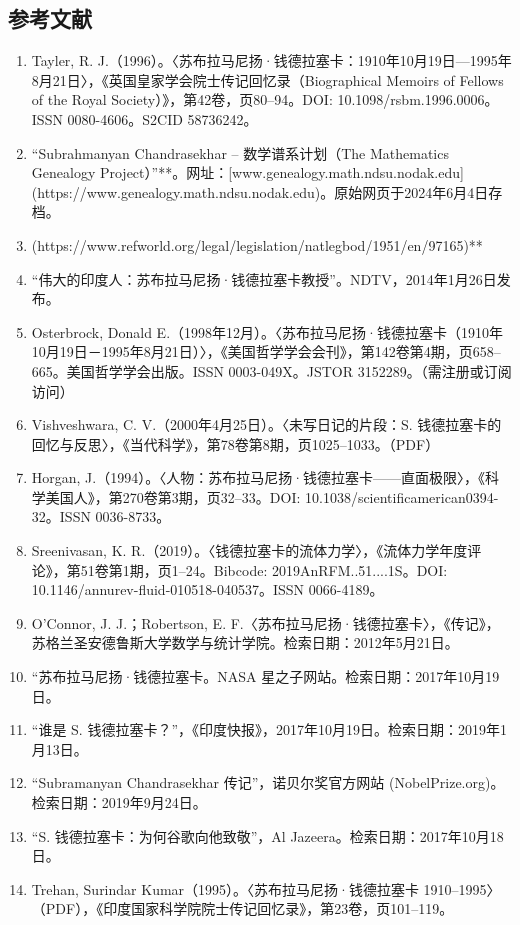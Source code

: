 \subsection{参考文献}
\begin{enumerate}
\item Tayler, R. J.（1996）。〈苏布拉马尼扬·钱德拉塞卡：1910年10月19日—1995年8月21日〉，《英国皇家学会院士传记回忆录（Biographical Memoirs of Fellows of the Royal Society）》，第42卷，页80–94。DOI: 10.1098/rsbm.1996.0006。ISSN 0080-4606。S2CID 58736242。
\item “Subrahmanyan Chandrasekhar – 数学谱系计划（The Mathematics Genealogy Project）”**。网址：[www.genealogy.math.ndsu.nodak.edu](https://www.genealogy.math.ndsu.nodak.edu)。原始网页于2024年6月4日存档。
\item [1](https://www.refworld.org/legal/legislation/natlegbod/1951/en/97165)**
\item “伟大的印度人：苏布拉马尼扬·钱德拉塞卡教授”。NDTV，2014年1月26日发布。
\item Osterbrock, Donald E.（1998年12月）。〈苏布拉马尼扬·钱德拉塞卡（1910年10月19日－1995年8月21日）〉，《美国哲学学会会刊》，第142卷第4期，页658–665。美国哲学学会出版。ISSN 0003-049X。JSTOR 3152289。（需注册或订阅访问）
\item Vishveshwara, C. V.（2000年4月25日）。〈未写日记的片段：S. 钱德拉塞卡的回忆与反思〉，《当代科学》，第78卷第8期，页1025–1033。（PDF）
\item Horgan, J.（1994）。〈人物：苏布拉马尼扬·钱德拉塞卡——直面极限〉，《科学美国人》，第270卷第3期，页32–33。DOI: 10.1038/scientificamerican0394-32。ISSN 0036-8733。
\item Sreenivasan, K. R.（2019）。〈钱德拉塞卡的流体力学〉，《流体力学年度评论》，第51卷第1期，页1–24。Bibcode: 2019AnRFM..51....1S。DOI: 10.1146/annurev-fluid-010518-040537。ISSN 0066-4189。
\item O’Connor, J. J.；Robertson, E. F.〈苏布拉马尼扬·钱德拉塞卡〉，《传记》，苏格兰圣安德鲁斯大学数学与统计学院。检索日期：2012年5月21日。
\item “苏布拉马尼扬·钱德拉塞卡。NASA 星之子网站。检索日期：2017年10月19日。
\item “谁是 S. 钱德拉塞卡？”，《印度快报》，2017年10月19日。检索日期：2019年1月13日。
\item “Subramanyan Chandrasekhar 传记”，诺贝尔奖官方网站 (NobelPrize.org)。检索日期：2019年9月24日。
\item “S. 钱德拉塞卡：为何谷歌向他致敬”，Al Jazeera。检索日期：2017年10月18日。
\item Trehan, Surindar Kumar（1995）。〈苏布拉马尼扬·钱德拉塞卡 1910–1995〉（PDF），《印度国家科学院院士传记回忆录》，第23卷，页101–119。

\end{enumerate}
